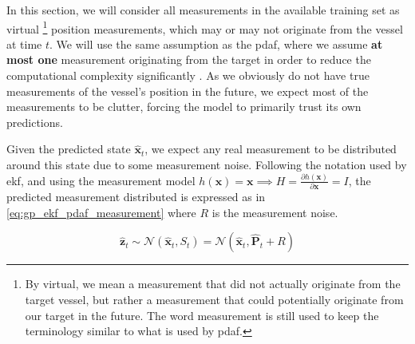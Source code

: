In this section, we will consider all measurements in the available training set as virtual \footnote{By virtual, we mean a measurement that did not actually originate from the target vessel, but rather a measurement that could potentially originate from our target in the future. The word measurement is still used to keep the terminology similar to what is used by \acrshort{pdaf}.} position measurements, which may or may not originate from the vessel at time $t$. We will use the same assumption as the \acrshort{pdaf}, where we assume \textbf{at most one} measurement originating from the target in order to reduce the computational complexity significantly \cite{sensorfusjon}. As we obviously do not have true measurements of the vessel's position in the future, we expect most of the measurements to be clutter, forcing the model to primarily trust its own predictions. 

Given the predicted state $\hat{\boldsymbol{x}}_t$, we expect any real measurement to be distributed around this state due to some measurement noise. Following the notation used by \acrshort{ekf}, and using the measurement model $h(\boldsymbol{x}) = \boldsymbol{x} \implies H = \frac{\partial h (\boldsymbol{x})}{\partial \boldsymbol{x}} = I$, the predicted measurement distributed is expressed as in \cref{eq:gp_ekf_pdaf_measurement} where $R$ is the measurement noise.

\begin{equation} \label{eq:gp_ekf_pdaf_measurement}
    \hat{\boldsymbol{z}}_t \sim \mathcal{N}(\hat{\boldsymbol{x}}_t, S_{t}) = \mathcal{N}(\hat{\boldsymbol{x}}_t, \hat{\boldsymbol{P}}_t + R)
\end{equation}

